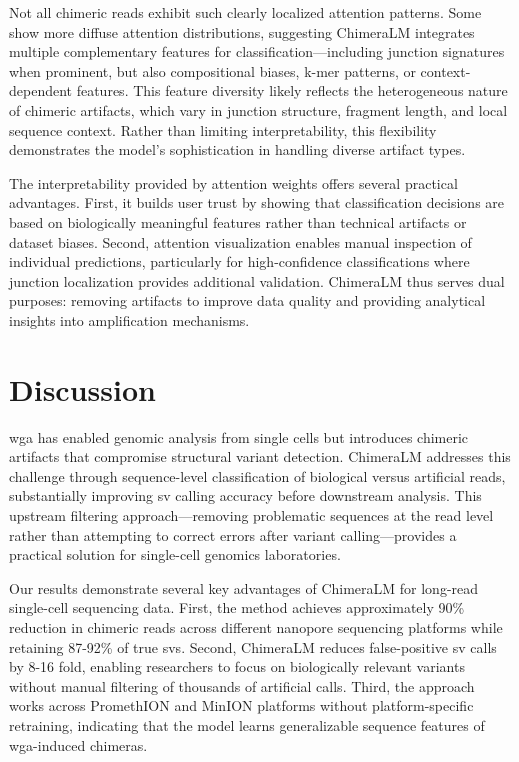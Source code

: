\documentclass[pdflatex,sn-nature,lineno]{sn-jnl}%
\theoremstyle{thmstyleone}%
\theoremstyle{thmstyletwo}%
\theoremstyle{thmstylethree}%
\begin{document}
Not all chimeric reads exhibit such clearly localized attention patterns. 
Some show more diffuse attention distributions, suggesting ChimeraLM integrates multiple complementary features for classification—including junction signatures when prominent, but also compositional biases, k-mer patterns, or context-dependent features. 
This feature diversity likely reflects the heterogeneous nature of chimeric artifacts, which vary in junction structure, fragment length, and local sequence context. 
Rather than limiting interpretability, this flexibility demonstrates the model's sophistication in handling diverse artifact types.

The interpretability provided by attention weights offers several practical advantages. 
First, it builds user trust by showing that classification decisions are based on biologically meaningful features rather than technical artifacts or dataset biases. 
Second, attention visualization enables manual inspection of individual predictions, particularly for high-confidence classifications where junction localization provides additional validation. 
ChimeraLM thus serves dual purposes: removing artifacts to improve data quality and providing analytical insights into amplification mechanisms.

\section*{Discussion}\label{sec:discussion}

\gls{wga} has enabled genomic analysis from single cells but introduces chimeric artifacts that compromise structural variant detection. ChimeraLM addresses this challenge through sequence-level classification of biological versus artificial reads, substantially improving \gls{sv} calling accuracy before downstream analysis. This upstream filtering approach—removing problematic sequences at the read level rather than attempting to correct errors after variant calling—provides a practical solution for single-cell genomics laboratories.

Our results demonstrate several key advantages of ChimeraLM for long-read single-cell sequencing data. First, the method achieves approximately 90\% reduction in chimeric reads across different nanopore sequencing platforms while retaining 87-92\% of true \glspl{sv}.
Second, ChimeraLM reduces false-positive \gls{sv} calls by 8-16 fold, enabling researchers to focus on biologically relevant variants without manual filtering of thousands of artificial calls. Third, the approach works across PromethION and MinION platforms without platform-specific retraining, indicating that the model learns generalizable sequence features of \gls{wga}-induced chimeras.
\end{document}
